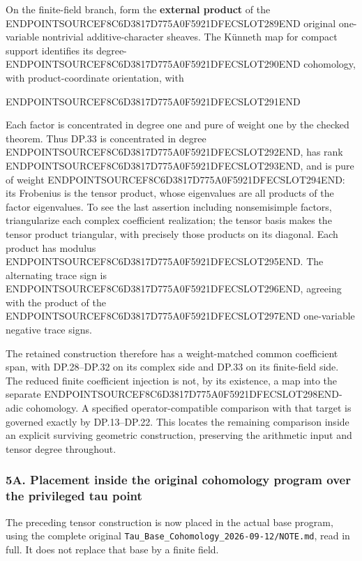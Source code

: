 On the finite-field branch, form the \textbf{external product} of the ENDPOINTSOURCEF8C6D3817D775A0F5921DFECSLOT289END original one-variable nontrivial additive-character sheaves. The Künneth map for compact support identifies its degree-ENDPOINTSOURCEF8C6D3817D775A0F5921DFECSLOT290END cohomology, with product-coordinate orientation, with

ENDPOINTSOURCEF8C6D3817D775A0F5921DFECSLOT291END

Each factor is concentrated in degree one and pure of weight one by the checked theorem. Thus DP.33 is concentrated in degree ENDPOINTSOURCEF8C6D3817D775A0F5921DFECSLOT292END, has rank ENDPOINTSOURCEF8C6D3817D775A0F5921DFECSLOT293END, and is pure of weight ENDPOINTSOURCEF8C6D3817D775A0F5921DFECSLOT294END: its Frobenius is the tensor product, whose eigenvalues are all products of the factor eigenvalues. To see the last assertion including nonsemisimple factors, triangularize each complex coefficient realization; the tensor basis makes the tensor product triangular, with precisely those products on its diagonal. Each product has modulus ENDPOINTSOURCEF8C6D3817D775A0F5921DFECSLOT295END. The alternating trace sign is ENDPOINTSOURCEF8C6D3817D775A0F5921DFECSLOT296END, agreeing with the product of the ENDPOINTSOURCEF8C6D3817D775A0F5921DFECSLOT297END one-variable negative trace signs.

The retained construction therefore has a weight-matched common coefficient span, with DP.28--DP.32 on its complex side and DP.33 on its finite-field side. The reduced finite coefficient injection is not, by its existence, a map into the separate ENDPOINTSOURCEF8C6D3817D775A0F5921DFECSLOT298END-adic cohomology. A specified operator-compatible comparison with that target is governed exactly by DP.13--DP.22. This locates the remaining comparison inside an explicit surviving geometric construction, preserving the arithmetic input and tensor degree throughout.

\subsubsection{5A. Placement inside the original cohomology program over the privileged tau point}\label{endpoint-purity_review--a.-placement-inside-the-original-cohomology-program-over-the-privileged-tau-point}

The preceding tensor construction is now placed in the actual base program, using the complete original \texttt{Tau\_Base\_Cohomology\_2026-09-12/NOTE.md}, read in full. It does not replace that base by a finite field.

